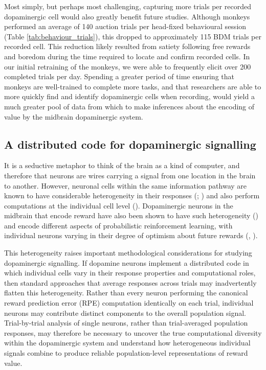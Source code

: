Most simply, but perhaps most challenging, capturing more trials per recorded dopaminergic cell would also greatly benefit future studies. Although monkeys performed an average of 140 auction trials per head-fixed behavioural session (Table \ref{tab:behaviour_trials}), this dropped to approximately 115 BDM trials per recorded cell. This reduction likely resulted from satiety following free rewards and boredom during the time required to locate and confirm recorded cells. In our initial retraining of the monkeys, we were able to frequently elicit over 200 completed trials per day. Spending a greater period of time ensuring that monkeys are well-trained to complete more tasks, and that researchers are able to more quickly find and identify dopaminergic cells when recording, would yield a much greater pool of data from which to make inferences about the encoding of value by the midbrain dopaminergic system.

\subsection{A distributed code for dopaminergic signalling}\label{subsec:da_distributed_code}

It is a seductive metaphor to think of the brain as a kind of computer, and therefore that neurons are wires carrying a signal from one location in the brain to another. However, neuronal cells within the same information pathway are known to have considerable heterogeneity in their responses (\cite{martinFunctionalHeterogeneityNeighboring2013}; \cite{clancyStructureSingleWhisker2015}) and also perform computations at the individual cell level (\cite{brunelSingleNeuronDynamics2014}). Dopaminergic neurons in the midbrain that encode reward have also been shown to have such heterogeneity (\cite{ferrari-tonioloCodingBasicComponents2025}) and encode different aspects of probabilistic reinforcement learning, with individual neurons varying in their degree of optimism about future rewards (\cite{dabneyDistributionalCodeValue2020}, \cite{Lowet_Zheng_Meng_Matias_Drugowitsch_Uchida_2025}).

This heterogeneity raises important methodological considerations for studying dopaminergic signalling. If dopamine neurons implement a distributed code in which individual cells vary in their response properties and computational roles, then standard approaches that average responses across trials may inadvertently flatten this heterogeneity. Rather than every neuron performing the canonical reward prediction error (RPE) computation identically on each trial, individual neurons may contribute distinct components to the overall population signal. Trial-by-trial analysis of single neurons, rather than trial-averaged population responses, may therefore be necessary to uncover the true computational diversity within the dopaminergic system and understand how heterogeneous individual signals combine to produce reliable population-level representations of reward value.


